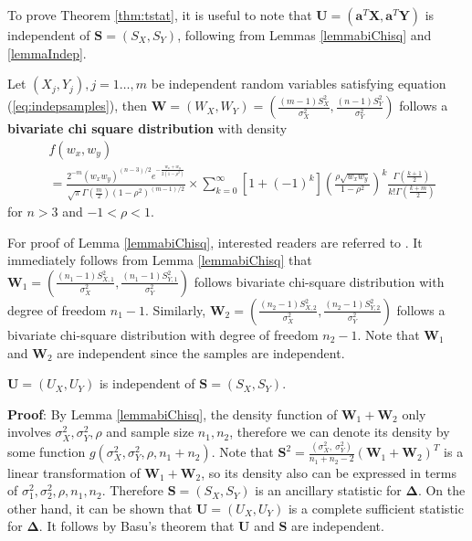 To prove Theorem \ref{thm:tstat}, it is useful to note that $\bm U = (\bm a^T\bm X, \bm a^T\bm 
Y)$ is independent of $\bm S = (S_X, S_Y)$,
following from Lemmas \ref{lemmabiChisq} and \ref{lemmaIndep}.
\begin{lemma}\label{lemmabiChisq}
	Let $(X_{j}, Y_{j}), j=1 \ldots,  m$ be independent random variables satisfying equation 
	(\ref{eq:indepsamples}),
	then $\bm W = (W_{X},W_{Y}) =(\frac{(m -1)S_{X}^2}{\sigma_X^2}, 
	\frac{(n-1)S_{Y}^2}{\sigma_Y^2})$ 
	follows a \textbf{bivariate chi square distribution} with density 
	\begin{equation}\label{biChisq}
	\begin{aligned}
	&f(w_x, w_y) \\
	& = \frac{2^{-m}(w_xw_y)^{(n-3)/2}e^{-\frac{w_x +
				w_y}{2(1-\rho^2)}}}{\sqrt{\pi}\Gamma(\frac{m}{2})(1-\rho^2)^{(m-1)/2}} 
	\times  \sum_{k=0}^{\infty}[1 +
	(-1)^k]\left(\frac{\rho\sqrt{w_xw_y}}{1-\rho^2}\right)^k\frac{\Gamma(\frac{k+1}{2})}{k!\Gamma(\frac{k+
			m}{2})}
	\end{aligned}
	\end{equation}
	for $n>3$ and $-1<\rho < 1$.
\end{lemma}
For proof of Lemma \ref{lemmabiChisq}, interested readers are referred to 
\citet{joarder2009moments}.
It immediately follows from Lemma \ref{lemmabiChisq} that $\bm W_1 = (\frac{(n_1 -1)S_{X, 
		1}^2}{\sigma_X^2}, \frac{(n_1-1)S_{Y, 1}^2}{\sigma_Y^2})$ follows bivariate chi-square 
distribution with degree of freedom $n_1-1$. Similarly, $\bm W_2 =(\frac{(n_2 -1)S_{X, 
		2}^2}{\sigma_X^2}, \frac{(n_2-1)S_{Y, 2}^2}{\sigma_Y^2})$ follows a bivariate chi-square 
distribution with degree of freedom $n_2-1$.  Note that $\bm W_1$ and $\bm W_2$ are independent 
since the samples are independent. 

\begin{lemma}\label{lemmaIndep}
	$\bm U =(U_X, U_Y)$ is independent of $\bm S = (S_X ,S_Y)$.
\end{lemma}
\textbf{Proof}: By Lemma \ref{lemmabiChisq}, the density function of $
\bm W_1 + \bm W_2$ only involves $\sigma^2_X, \sigma^2_Y, \rho$ and sample size $n_1, n_2$, 
therefore
we can denote its density by some function $g(\sigma^2_X, \sigma^2_Y, \rho,
n_1 + n_2)$. Note that $\bm S^2 = \frac{(\sigma_X^2, ~\sigma^2_Y)}{n_1 +n_2 -2}(\bm W_1 + \bm 
W_2)^T $
is a linear transformation of $\bm W_1 + \bm W_2$, so its density also can be expressed in 
terms of $\sigma^2_1, \sigma^2_2, \rho, n_1, n_2$. Therefore $\bm S = (S_X ,S_Y)$ is an 
ancillary statistic for $\bm \Delta$. On the other hand, it can
be shown that $\bm U =(U_X, U_Y)$ is a complete sufficient statistic for $\bm \Delta$. It 
follows by
Basu's theorem that $\bm U$ and $\bm S$ are independent. 


